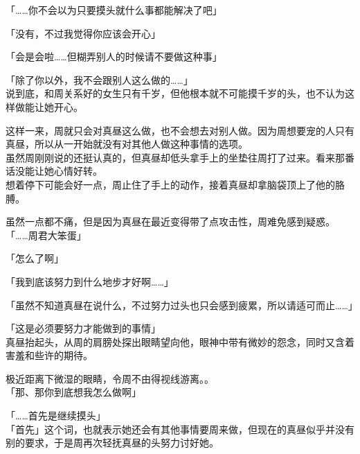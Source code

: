 「……你不会以为只要摸头就什么事都能解决了吧」

「没有，不过我觉得你应该会开心」

「会是会啦……但糊弄别人的时候请不要做这种事」

「除了你以外，我不会跟别人这么做的……」\\

说到底，和周关系好的女生只有千岁，但他根本就不可能摸千岁的头，也不认为这样做能让她开心。

这样一来，周就只会对真昼这么做，也不会想去对别人做。因为周想要宠的人只有真昼，所以从一开始就没有对其他人做这种事情的选项。\\

虽然周刚刚说的还挺认真的，但真昼却低头拿手上的坐垫往周打了过来。看来那番话没能让她心情好转。\\

想着停下可能会好一点，周止住了手上的动作，接着真昼却拿脑袋顶上了他的胳膊。

虽然一点都不痛，但是因为真昼在最近变得带了点攻击性，周难免感到疑惑。\\

「……周君大笨蛋」

「怎么了啊」

「我到底该努力到什么地步才好啊……」

「虽然不知道真昼在说什么，不过努力过头也只会感到疲累，所以请适可而止……」

「这是必须要努力才能做到的事情」\\

真昼抬起头，从周的肩膀处探出眼睛望向他，眼神中带有微妙的怨念，同时又含着害羞和些许的期待。

极近距离下微湿的眼睛，令周不由得视线游离。。\\

「那、那你到底想我怎么做啊」

「……首先是继续摸头」\\

「首先」这个词，也就表示她还会有其他事情要周来做，但现在的真昼似乎并没有别的要求，于是周再次轻抚真昼的头努力讨好她。
